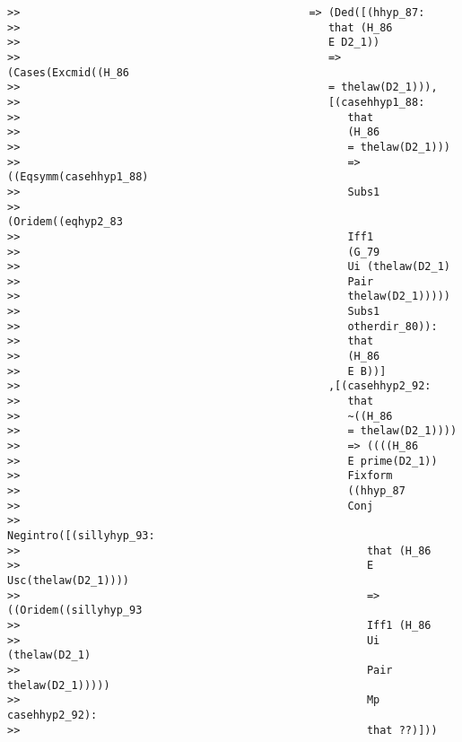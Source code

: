\documentclass[12pt]{article}
\begin{document}
\begin{verbatim}
>>                                             => (Ded([(hhyp_87:
>>                                                that (H_86
>>                                                E D2_1))
>>                                                => (Cases(Excmid((H_86
>>                                                = thelaw(D2_1))),
>>                                                [(casehhyp1_88:
>>                                                   that
>>                                                   (H_86
>>                                                   = thelaw(D2_1)))
>>                                                   => ((Eqsymm(casehhyp1_88)
>>                                                   Subs1
>>                                                   (Oridem((eqhyp2_83
>>                                                   Iff1
>>                                                   (G_79
>>                                                   Ui (thelaw(D2_1)
>>                                                   Pair
>>                                                   thelaw(D2_1)))))
>>                                                   Subs1
>>                                                   otherdir_80)):
>>                                                   that
>>                                                   (H_86
>>                                                   E B))]
>>                                                ,[(casehhyp2_92:
>>                                                   that
>>                                                   ~((H_86
>>                                                   = thelaw(D2_1))))
>>                                                   => ((((H_86
>>                                                   E prime(D2_1))
>>                                                   Fixform
>>                                                   ((hhyp_87
>>                                                   Conj
>>                                                   Negintro([(sillyhyp_93:
>>                                                      that (H_86
>>                                                      E Usc(thelaw(D2_1))))
>>                                                      => ((Oridem((sillyhyp_93
>>                                                      Iff1 (H_86
>>                                                      Ui (thelaw(D2_1)
>>                                                      Pair thelaw(D2_1)))))
>>                                                      Mp casehhyp2_92):
>>                                                      that ??)]))

\end{verbatim}
\end{document}
